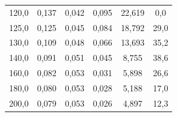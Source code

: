 \documentclass[a4paper, czech]{article}
\begin{document}
\begin{table}[H]
\begin{tabular}{cccccc}
        120,0      & 0,137                                                                       & 0,042                                                                       & 0,095                                                                 & 22,619                                                         & 0,0                                                           \\
        125,0      & 0,125                                                                       & 0,045                                                                       & 0,084                                                                 & 18,792                                                         & 29,0                                                          \\
        130,0      & 0,109                                                                       & 0,048                                                                       & 0,066                                                                 & 13,693                                                         & 35,2                                                          \\
        140,0      & 0,091                                                                       & 0,051                                                                       & 0,045                                                                 & 8,755                                                          & 38,6                                                          \\
        160,0      & 0,082                                                                       & 0,053                                                                       & 0,031                                                                 & 5,898                                                          & 26,6                                                          \\
        180,0      & 0,080                                                                       & 0,053                                                                       & 0,028                                                                 & 5,188                                                          & 17,0                                                          \\
        200,0      & 0,079                                                                       & 0,053                                                                       & 0,026                                                                 & 4,897                                                          & 12,3                                                          \\

\end{tabular}
\end{table}
\end{document}

